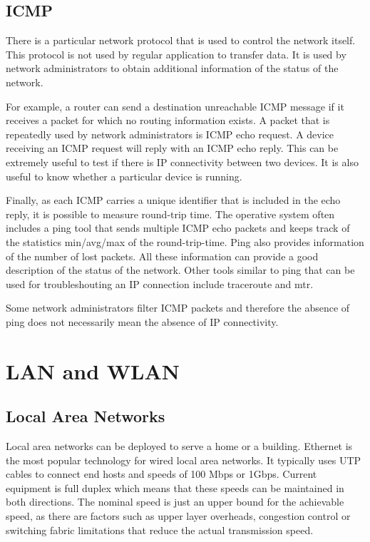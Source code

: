 \subsection{ICMP}

There is a particular network protocol that is used to control the network itself.
This protocol is not used by regular application to transfer data. 
It is used by network administrators to obtain additional information of the status of the network.

For example, a router can send a destination unreachable ICMP message if it receives a packet for which no routing information exists.
A packet that is repeatedly used by network administrators is ICMP echo request.
A device receiving an ICMP request will reply with an ICMP echo reply.
This can be extremely useful to test if there is IP connectivity between two devices.
It is also useful to know whether a particular device is running.

Finally, as each ICMP carries a unique identifier that is included in the echo reply, it is possible to measure round-trip time.
The operative system often includes a ping tool that sends multiple ICMP echo packets and keeps track of the statistics min/avg/max of the round-trip-time.
Ping also provides information of the number of lost packets.
All these information can provide a good description of the status of the network.
Other tools similar to ping that can be used for troubleshouting an IP connection include traceroute and mtr.

Some network administrators filter ICMP packets and therefore the absence of ping does not necessarily mean the absence of IP connectivity.

\section{LAN and WLAN}

\subsection{Local Area Networks}

Local area networks can be deployed to serve a home or a building.
Ethernet is the most popular technology for wired local area networks.
It typically uses UTP cables to connect end hosts and speeds of 100 Mbps or 1Gbps.
Current equipment is full duplex which means that these speeds can be maintained in both directions.
The nominal speed is just an upper bound for the achievable speed, as there are factors such as upper layer overheads, congestion control or switching fabric limitations that reduce the actual transmission speed.

